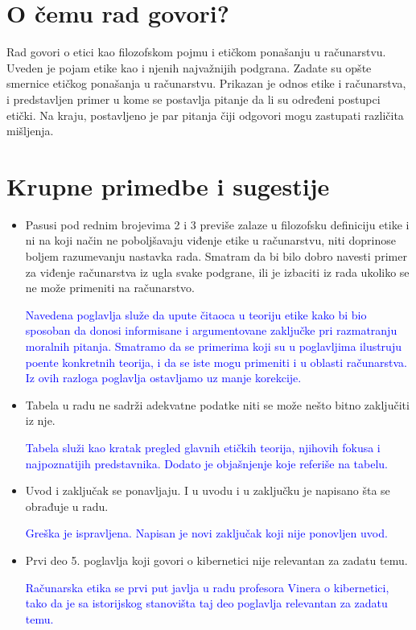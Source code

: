 \documentclass[a4paper]{report}
\newcommand{\odgovor}[1]{\textcolor{blue}{#1}}
\begin{document}
\section{O čemu rad govori?}

Rad govori o etici kao filozofskom pojmu i etičkom ponašanju u računarstvu. Uveden je pojam etike kao i njenih najvažnijih podgrana. Zadate su opšte smernice etičkog ponašanja u računarstvu. Prikazan je odnos etike i računarstva, i predstavljen primer u kome se postavlja pitanje da li su određeni postupci etički. Na kraju, postavljeno je par pitanja čiji odgovori mogu zastupati različita mišljenja.


\section{Krupne primedbe i sugestije}
\begin{itemize}
    \item Pasusi pod rednim brojevima 2 i 3 previše zalaze u filozofsku definiciju etike i ni na koji način ne poboljšavaju viđenje etike u računarstvu, niti doprinose boljem razumevanju nastavka rada. Smatram da bi bilo dobro navesti primer za viđenje računarstva iz ugla svake podgrane, ili je izbaciti iz rada ukoliko se ne može primeniti na računarstvo.
    
    \odgovor{Navedena poglavlja služe da upute čitaoca u teoriju etike kako bi bio sposoban da donosi informisane i argumentovane zaključke pri razmatranju moralnih pitanja. Smatramo da se primerima koji su u poglavljima ilustruju poente konkretnih teorija, i da se iste mogu primeniti i u oblasti računarstva. Iz ovih razloga poglavlja ostavljamo uz manje korekcije. } 
    
    
    \item Tabela u radu ne sadrži adekvatne podatke niti se može nešto bitno zaključiti iz nje.

\odgovor{Tabela služi kao kratak pregled glavnih etičkih teorija, njihovih fokusa i najpoznatijih predstavnika. Dodato je objašnjenje koje referiše na tabelu. }

    \item Uvod i zaključak se ponavljaju. I u uvodu i u zaključku je napisano šta se obrađuje u radu.
    
    \odgovor{Greška je ispravljena. Napisan je novi zaključak koji nije ponovljen uvod.}
    
    \item Prvi deo 5. poglavlja koji govori o kibernetici nije relevantan za zadatu temu.
    
    \odgovor{Računarska etika se prvi put javlja u radu profesora Vinera o kibernetici, tako da je sa istorijskog stanovišta taj deo poglavlja relevantan za zadatu temu.}

\end{itemize}
\end{document}
